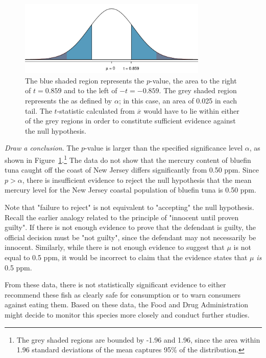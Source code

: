 \begin{example}
\begin{figure}[h]
	\centering
	\includegraphics[width=0.8\textwidth]{ch_inference_foundations_oi_biostat/figures/pValueTuna/pValueTuna}
	\caption{The blue shaded region represents the $p$-value, the area to the right of $t = 0.859$ and to the left of $-t = -0.859$. The grey shaded region represents the  as defined by $\alpha$; in this case, an area of 0.025 in each tail. The $t$-statistic calculated from $\overline{x}$ would have to lie within either of the grey regions in order to constitute sufficient evidence against the null hypothesis.}
	\label{pValueTuna}
\end{figure}

\textit{Draw a conclusion}. The $p$-value is larger than the specified significance level $\alpha$, as shown in Figure~\ref{pValueTuna}.\footnote{The grey shaded regions are bounded by -1.96 and 1.96, since the area within 1.96 standard deviations of the mean captures 95\% of the distribution.} The data do not show that the mercury content of bluefin tuna caught off the coast of New Jersey differs significantly from 0.50 ppm. Since $p > \alpha$, there is insufficient evidence to reject the null hypothesis that the mean mercury level for the New Jersey coastal population of bluefin tuna is 0.50 ppm. 

Note that "failure to reject" is not equivalent to "accepting" the null hypothesis. Recall the earlier analogy related to the principle of "innocent until proven guilty". If there is not enough evidence to prove that the defendant is guilty, the official decision must be "not guilty", since the defendant may not necessarily be innocent. Similarly, while there is not enough evidence to suggest that $\mu$ is not equal to 0.5 ppm, it would be incorrect to claim that the evidence states that $\mu$ \textit{is} 0.5 ppm.

From these data, there is not statistically significant evidence to either recommend these fish as clearly safe for consumption or to warn consumers against eating them. Based on these data, the Food and Drug Administration might decide to monitor this species more closely and conduct further studies. 

\end{example}


